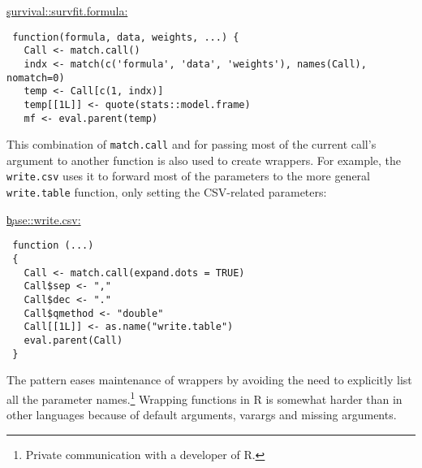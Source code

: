 \documentclass[review,screen,acmsmall]{acmart}%
\renewcommand{\k}[1]{\lstinline |#1|\xspace}
\begin{document}
\begin{minipage}{.95\textwidth}
  \medskip\underline{\c{survival::survfit.formula}:}
\begin{lstlisting}
 function(formula, data, weights, ...) {
   Call <- match.call()
   indx <- match(c('formula', 'data', 'weights'), names(Call), nomatch=0)
   temp <- Call[c(1, indx)]
   temp[[1L]] <- quote(stats::model.frame)
   mf <- eval.parent(temp)
\end{lstlisting}\medskip
\end{minipage}

This combination of \k{match.call} and \eval for passing most of the current
call's argument to another function is also used to create wrappers. For
example, the \k{write.csv} uses it to forward most of the parameters to the
more general \k{write.table} function, only setting the CSV-related
parameters:

\begin{minipage}{.95\textwidth}
  \medskip\underline{\c{base::write.csv}:}
\begin{lstlisting}
 function (...)
 {
   Call <- match.call(expand.dots = TRUE)
   Call$sep <- ","
   Call$dec <- "."
   Call$qmethod <- "double"
   Call[[1L]] <- as.name("write.table")
   eval.parent(Call)
 }
\end{lstlisting}\medskip
\end{minipage}

The pattern eases maintenance of wrappers by avoiding the need to explicitly
list all the parameter names.\footnote{Private communication with a developer of
  R.} Wrapping functions in R is somewhat harder than in other languages because
of default arguments, varargs and missing arguments.



\end{document}
